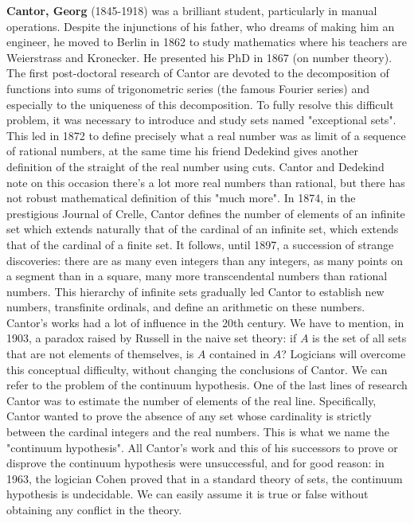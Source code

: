 \textbf{Cantor, Georg} (1845-1918) was a brilliant student, particularly in manual operations. Despite the injunctions of his father, who dreams of making him an engineer, he moved to Berlin in 1862 to study mathematics where his teachers are Weierstrass and Kronecker. He presented his PhD in 1867 (on number theory). The first post-doctoral research of Cantor are devoted to the decomposition of functions into sums of trigonometric series (the famous Fourier series) and especially to the uniqueness of this decomposition. To fully resolve this difficult problem, it was necessary to introduce and study sets named "exceptional sets". This led in 1872 to define precisely what a real number was as limit of a sequence of rational numbers, at the same time his friend Dedekind gives another definition of the straight of the real number using cuts. Cantor and Dedekind note on this occasion there's a lot more real numbers than rational, but there has not robust mathematical definition of this "much more". In 1874, in the prestigious Journal of Crelle, Cantor defines the number of elements of an infinite set which extends naturally that of the cardinal of an infinite set, which extends that of the cardinal of a finite set. It follows, until 1897, a succession of strange discoveries: there are as many even integers than any integers, as many points on a segment than in a square, many more transcendental numbers than rational numbers. This hierarchy of infinite sets gradually led Cantor to establish new numbers, transfinite ordinals, and define an arithmetic on these numbers. Cantor's works had a lot of influence in the 20th century. We have to mention, in 1903, a paradox raised by Russell in the naive set theory: if $A$ is the set of all sets that are not elements of themselves, is $A$ contained in $A$? Logicians will overcome this conceptual difficulty, without changing the conclusions of Cantor. We can refer to the problem of the continuum hypothesis. One of the last lines of research Cantor was to estimate the number of elements of the real line. Specifically, Cantor wanted to prove the absence of any set whose cardinality is strictly between the cardinal integers and the real numbers. This is what we name the "continuum hypothesis". All Cantor's work and this of his successors to prove or disprove the continuum hypothesis were unsuccessful, and for good reason: in 1963, the logician Cohen proved that in a standard theory of sets, the continuum hypothesis is undecidable. We can easily assume it is true or false without obtaining any conflict in the theory.

